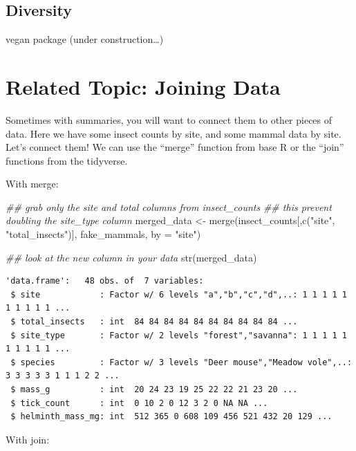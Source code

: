 \documentclass[
  letterpaper,
  DIV=11,
  numbers=noendperiod]{scrreprt}
\newenvironment{Shaded}{\begin{snugshade}}{\end{snugshade}}
\newcommand{\AttributeTok}[1]{\textcolor[rgb]{0.40,0.45,0.13}{#1}}
\newcommand{\DocumentationTok}[1]{\textcolor[rgb]{0.37,0.37,0.37}{\textit{#1}}}
\newcommand{\FunctionTok}[1]{\textcolor[rgb]{0.28,0.35,0.67}{#1}}
\newcommand{\NormalTok}[1]{\textcolor[rgb]{0.00,0.23,0.31}{#1}}
\newcommand{\OtherTok}[1]{\textcolor[rgb]{0.00,0.23,0.31}{#1}}
\newcommand{\StringTok}[1]{\textcolor[rgb]{0.13,0.47,0.30}{#1}}
\begin{document}
\subsection{Diversity}\label{diversity}

vegan package (under construction\ldots)

\section{Related Topic: Joining Data}\label{related-topic-joining-data}

Sometimes with summaries, you will want to connect them to other pieces
of data. Here we have some insect counts by site, and some mammal data
by site. Let's connect them! We can use the ``merge'' function from base
R or the ``join'' functions from the tidyverse.

With merge:

\begin{Shaded}
\begin{Highlighting}[]
\DocumentationTok{\#\# grab only the site and total columns from insect\_counts}
\DocumentationTok{\#\# this prevent doubling the site\_type column}
\NormalTok{merged\_data }\OtherTok{\textless{}{-}} \FunctionTok{merge}\NormalTok{(insect\_counts[,}\FunctionTok{c}\NormalTok{(}\StringTok{"site"}\NormalTok{, }\StringTok{"total\_insects"}\NormalTok{)], fake\_mammals, }\AttributeTok{by =} \StringTok{"site"}\NormalTok{)}

\DocumentationTok{\#\# look at the new column in your data}
\FunctionTok{str}\NormalTok{(merged\_data)}
\end{Highlighting}
\end{Shaded}

\begin{verbatim}
'data.frame':   48 obs. of  7 variables:
 $ site            : Factor w/ 6 levels "a","b","c","d",..: 1 1 1 1 1 1 1 1 1 1 ...
 $ total_insects   : int  84 84 84 84 84 84 84 84 84 84 ...
 $ site_type       : Factor w/ 2 levels "forest","savanna": 1 1 1 1 1 1 1 1 1 1 ...
 $ species         : Factor w/ 3 levels "Deer mouse","Meadow vole",..: 3 3 3 3 3 1 1 1 2 2 ...
 $ mass_g          : int  20 24 23 19 25 22 22 21 23 20 ...
 $ tick_count      : int  0 10 2 0 12 3 2 0 NA NA ...
 $ helminth_mass_mg: int  512 365 0 608 109 456 521 432 20 129 ...
\end{verbatim}

With join:
\end{document}
